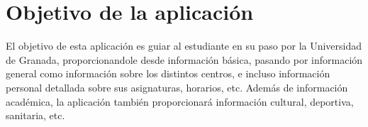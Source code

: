 \section{Objetivo de la aplicación}

El objetivo de esta aplicación es guiar al estudiante en su paso por la Universidad de Granada, proporcionandole desde información básica, pasando por información general como información sobre los distintos centros, e incluso información personal detallada sobre sus asignaturas, horarios, etc. Además de información académica, la aplicación también proporcionará información cultural, deportiva, sanitaria, etc.
